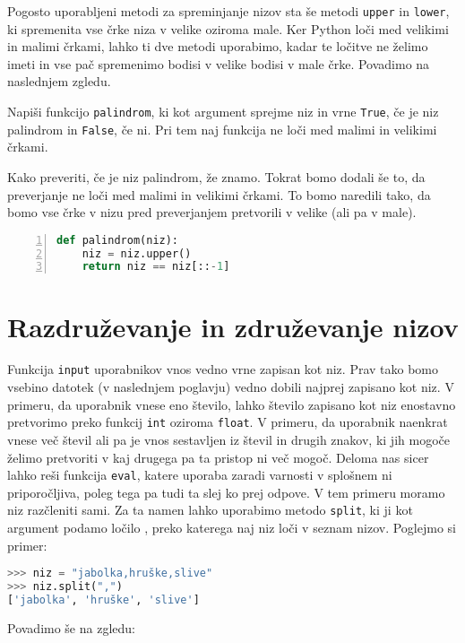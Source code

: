 Pogosto uporabljeni metodi za spreminjanje nizov sta še metodi \texttt{upper} in \texttt{lower}, ki spremenita vse črke niza v velike oziroma male. Ker Python loči med velikimi in malimi črkami, lahko ti dve metodi uporabimo, kadar te ločitve ne želimo imeti in vse pač spremenimo bodisi v velike bodisi v male črke. Povadimo na naslednjem zgledu.

\begin{zgled}
Napiši funkcijo \texttt{palindrom}, ki kot argument sprejme niz in vrne \texttt{True}, če je niz palindrom in \texttt{False}, če ni. Pri tem naj funkcija ne loči med malimi in velikimi črkami.
\end{zgled}

\begin{resitev}
Kako preveriti, če je niz palindrom, že znamo. Tokrat bomo dodali še to, da preverjanje ne loči med malimi in velikimi črkami. To bomo naredili tako, da bomo vse črke v nizu pred preverjanjem pretvorili v velike (ali pa v male).
\begin{lstlisting}[language=Python,numbers=left]
def palindrom(niz):
    niz = niz.upper()
    return niz == niz[::-1]
\end{lstlisting}
\end{resitev}

\section{Razdruževanje in združevanje nizov}
Funkcija \texttt{input} uporabnikov vnos vedno vrne zapisan kot niz. Prav tako bomo vsebino datotek (v naslednjem poglavju) vedno dobili najprej zapisano kot niz. V primeru, da uporabnik vnese eno število, lahko število zapisano kot niz enostavno pretvorimo preko funkcij \texttt{int} oziroma \texttt{float}. V primeru, da uporabnik naenkrat vnese več števil ali pa je vnos sestavljen iz števil in drugih znakov, ki jih mogoče želimo pretvoriti v kaj drugega pa ta pristop ni več mogoč. Deloma nas sicer lahko reši funkcija \texttt{eval}, katere uporaba zaradi varnosti v splošnem ni priporočljiva, poleg tega pa tudi ta slej ko prej odpove. V tem primeru moramo niz razčleniti  sami. Za ta namen lahko uporabimo metodo \texttt{split}, ki ji kot argument podamo ločilo , preko katerega naj niz loči v seznam nizov. Poglejmo si primer:
\begin{lstlisting}[language=Python]
>>> niz = "jabolka,hruške,slive"
>>> niz.split(",")
['jabolka', 'hruške', 'slive']
\end{lstlisting}
Povadimo še na zgledu:

